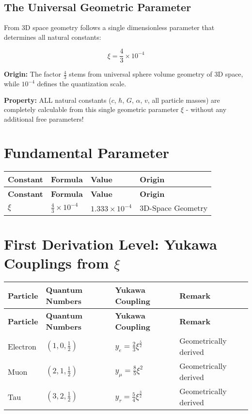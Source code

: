 \documentclass[12pt,a4paper]{article}
\begin{document}
\subsection{The Universal Geometric Parameter}

From 3D space geometry follows a single dimensionless parameter that determines all natural constants:

\begin{equation}
	\boxed{\xi = \frac{4}{3} \times 10^{-4}}
\end{equation}

\textbf{Origin:} The factor $\frac{4}{3}$ stems from universal sphere volume geometry of 3D space, while $10^{-4}$ defines the quantization scale.

\textbf{Property:} ALL natural constants ($c$, $\hbar$, $G$, $\alpha$, $v$, all particle masses) are completely calculable from this single geometric parameter $\xi$ - without any additional free parameters!	
	\section{Fundamental Parameter}
	
	\begin{longtable}{|p{3cm}|p{4cm}|p{3cm}|p{4cm}|}
		\hline
		\textbf{Constant} & \textbf{Formula} & \textbf{Value} & \textbf{Origin} \\
		\hline
		\endfirsthead
		\hline
		\textbf{Constant} & \textbf{Formula} & \textbf{Value} & \textbf{Origin} \\
		\hline
		\endhead
		\(\xi\) & \(\frac{4}{3} \times 10^{-4}\) & \(1.333 \times 10^{-4}\) & 3D-Space Geometry \\
		\hline
	\end{longtable}
	
	\section{First Derivation Level: Yukawa Couplings from \(\xi\)}
	
	\begin{longtable}{|p{2.5cm}|p{3cm}|p{4cm}|p{4cm}|}
		\hline
		\textbf{Particle} & \textbf{Quantum Numbers} & \textbf{Yukawa Coupling} & \textbf{Remark} \\
		\hline
		\endfirsthead
		\hline
		\textbf{Particle} & \textbf{Quantum Numbers} & \textbf{Yukawa Coupling} & \textbf{Remark} \\
		\hline
		\endhead
		Electron & \((1,0,\frac{1}{2})\) & \(y_e = \frac{2}{3}\xi^{\frac{5}{2}}\) & Geometrically derived \\
		\hline
		Muon & \((2,1,\frac{1}{2})\) & \(y_{\mu} = \frac{8}{5}\xi^{2}\) & Geometrically derived \\
		\hline
		Tau & \((3,2,\frac{1}{2})\) & \(y_{\tau} = \frac{5}{4}\xi^{\frac{3}{2}}\) & Geometrically derived \\
		\hline
	\end{longtable}
	
\end{document}
